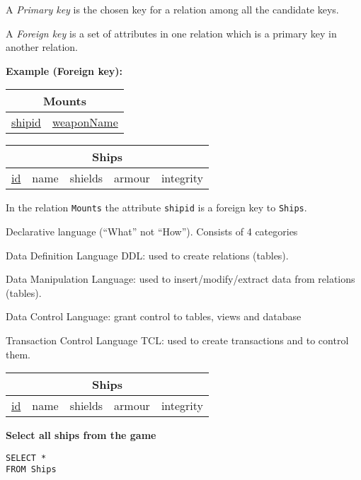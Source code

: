 \documentclass{beamer}
\begin{document}
\begin{slide}{
\item A \textit{Primary key} is the chosen key for a relation among all the candidate keys.
\item A \textit{Foreign key} is a set of attributes in one relation which is a primary key in another relation.

\vspace{0.5cm}
\textbf{Example (Foreign key):}\\

\centering
\begin{tabular}{|c|c|}
\hline
\multicolumn{2}{|c|}{\textbf{Mounts}} \\
\hline
\underline{shipid} & \underline{weaponName} \\
\hline
\end{tabular}

\vspace{0.2cm}
\begin{tabular}{|c|c|c|c|c|}
\hline
\multicolumn{5}{|c|}{\textbf{Ships}} \\
\hline
\underline{id} & name & shields & armour & integrity \\
\hline
\end{tabular}

\raggedright
\vspace{0.2cm}
In the relation \texttt{Mounts} the attribute \texttt{shipid} is a foreign key to \texttt{Ships}.


}\end{slide}

\begin{slide}{
\item Declarative language (``What'' not ``How''). Consists of 4 categories
\pause
\item Data Definition Language DDL: used to create relations (tables).
\item Data Manipulation Language: used to insert/modify/extract data from relations (tables).
\item Data Control Language: grant control to tables, views and database
\item Transaction Control Language TCL:  used to create transactions and to control them. 
}\end{slide}

\begin{frame}[fragile]
\begin{tabular}{|c|c|c|c|c|}
\hline
\multicolumn{5}{|c|}{\textbf{Ships}} \\
\hline
\underline{id} & name & shields & armour & integrity \\
\hline
\end{tabular}

\vspace{0.25cm}
\textbf{Select all ships from the game}
\pause
\begin{lstlisting}
SELECT *
FROM Ships
\end{lstlisting}

\end{frame}
\end{document}
